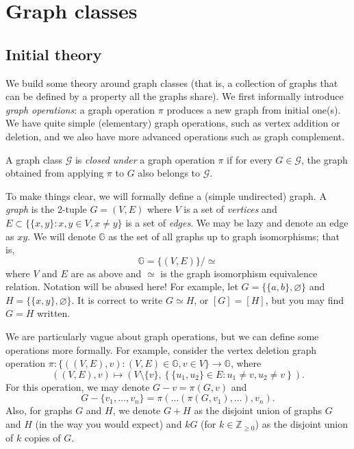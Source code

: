 \section{Graph classes}

\subsection{Initial theory}

We build some theory around graph classes (that is, a collection of graphs that can be defined by a property all the graphs share). We first informally introduce \emph{graph operations}: a graph operation $\pi$ produces a new graph from initial one(s). We have quite simple (elementary) graph operations, such as vertex addition or deletion, and we also have more advanced operations such as graph complement.

\begin{definition}[Closed]
  A graph class $\mathcal G$ is \emph{closed under} a graph operation $\pi$ if for every $G \in \mathcal G$, the graph obtained from applying $\pi$ to $G$ also belongs to $\mathcal G$.
\end{definition}


To make things clear, we will formally define a (simple undirected) graph. A \emph{graph} is the 2-tuple $G = (V,E)$ where $V$ is a set of \emph{vertices} and $E \subset \{\{x,y\}: x,y \in V, x \neq y\}$ is a set of \emph{edges}. We may be lazy and denote an edge as $xy$. We will denote $\mathbb G$ as the set of all graphs up to graph isomorphisms; that is,
\[ \mathbb G = \{(V, E)\}/{\simeq} \]
where $V$ and $E$ are as above and $\simeq$ is the graph isomorphism equivalence relation. Notation will be abused here! For example, let $G = \{\{a,b\}, \varnothing\}$ and $H = \{\{x,y\}, \varnothing\}$. It is correct to write $G \simeq H$, or $[G] = [H]$, but you may find $G = H$ written.

We are particularly vague about graph operations, but we can define some operations more formally. For example, consider the vertex deletion graph operation $\pi: \{((V,E), v): (V,E) \in \mathbb G, v \in V\} \to \mathbb G$, where
\[
  ((V,E), v) \mapsto \left(V \setminus \{v\}, \left\{\{u_1, u_2\} \in E: u_1 \neq v, u_2 \neq v\right\}\right).
\]
For this operation, we may denote $G-v = \pi(G, v)$ and
\[G - \{v_1, \ldots, v_n\} = \pi(\ldots(\pi(G, v_1), \ldots), v_n).\]
Also, for graphs $G$ and $H$, we denote $G + H$ as the disjoint union of graphs $G$ and $H$ (in the way you would expect) and $kG$ (for $k \in \mathbb Z_{\geq 0}$) as the disjoint union of $k$ copies of $G$.

